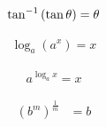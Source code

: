 \documentclass[20150903-160354-rs2.2-MarksMathNotebook.tex]{subfiles}
\begin{document}
\begin{property}
\begin{subequations}
\begin{align}
\tan^{-1} \left(\tan \theta \right) = \theta  \label{eq:arctan}
\end{align}
\end{subequations}
\end{property}

\begin{property}
\begin{subequations}
\begin{align}
\log_a \left(a^x \right)=x \label{eq:ei}
\end{align}
\end{subequations}
\end{property}

\begin{property}
\begin{subequations}
\begin{align}
a^{\log_a x}= x  \label{eq:li}
\end{align}
\end{subequations}
\end{property}

\begin{property}
\begin{subequations}
\begin{align}
\left(b^{m}\right)^{\frac{1}{m}} &= b  \label{eq:poi}
\end{align}
\end{subequations}
\end{property}
\end{document}

